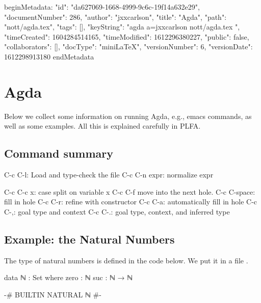 beginMetadata:
{
    "id": "da627069-1668-4999-9c6c-19f14a632e29",
    "documentNumber": 286,
    "author": "jxxcarlson",
    "title": "Agda",
    "path": "nott/agda.tex",
    "tags": [],
    "keyString": "agda a=jxxcarlson nott/agda.tex ",
    "timeCreated": 1604284514165,
    "timeModified": 1612296380227,
    "public": false,
    "collaborators": [],
    "docType": "miniLaTeX",
    "versionNumber": 6,
    "versionDate": 1612298913180
}
endMetadata



\setcounter{section}{3}

\section{Agda}

\innertableofcontents



Below we collect some information on running Agda, e.g., emacs commands, as well as some examples.  All this is explained carefully in PLFA.

\subsection{Command summary}

\begin{colored}[bash]
C-c C-l: Load and type-check the file
C-c C-n expr: normalize expr

C-c C-c x: case split on variable x
C-c C-f move into the next hole.
C-c C-space: fill in hole
C-c C-r: refine with constructor
C-c C-a: automatically fill in hole
C-c C-,: goal type and context
C-c C-.: goal type, context, and inferred type
\end{colored}


\subsection{Example: the Natural Numbers}

The type of natural numbers is defined in the code below.  We put it in a file .

\begin{colored}[elm]
data ℕ : Set where
    zero : ℕ
    suc  : ℕ → ℕ
  
{-# BUILTIN NATURAL ℕ #-}
\end{colored}

